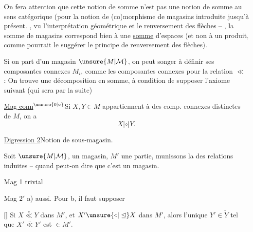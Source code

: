 
On fera attention que cette notion de somme n'est \uline{pas} une notion de somme au sens catégorique (pour la notion de (co)morphisme de magasins introduite jusqu'à présent. , vu l'interprétation géométrique et le renversement des flèches -- , la somme de magasins correspond bien à une \uline{somme} d'espaces (et non à un produit, comme pourrait le suggérer le principe de renversement des flèches).

Si on part d'un magasin $\unsure{M|\mathcal M}$, on peut songer à définir ses composantes connexes $M_i$, comme les composantes connexes pour la relation $\ll$ : On trouve une décomposition en somme, à condition de supposer l'axiome suivant (qui sera   par la suite)

\margin{\rule{0.35pt}{1.5cm}}
\uline{Mag conn$^{\unsure{0|\circ}}$}\quad Si $X,Y\in M$ appartiennent à des comp. connexes distinctes de $M$, on a
\[
X\mathrel{|\circ|}Y.
\]


\uline{Digression 2}\quad Notion de sous-magasin.

Soit $\unsure{M|\mathcal M}$, \inserted{$\trianglelefteq,\overset{\circ}{\ll},|\circ|$} un magasin, $M'$ une partie, munissons la des relations induites -- quand peut-on dire que c'est un magasin.

Mag 1 trivial

Mag $2'$ a) aussi. Pour b, il faut supposer

[] Si $X\overset{\circ}{\ll}Y$ dans $M'$, et $X'\unsure{\triangleleft|\trianglelefteq}X$ dans $M'$, alors l'unique $Y'\in\widetilde Y$ tel que $X'\overset{\circ}{\ll}Y'$ est $\in M'$.

